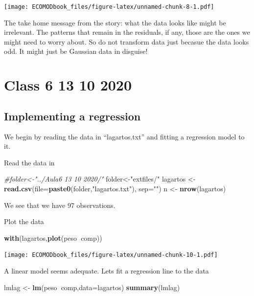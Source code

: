 \documentclass[
]{book}
\newenvironment{Shaded}{\begin{snugshade}}{\end{snugshade}}
\newcommand{\CommentTok}[1]{\textcolor[rgb]{0.56,0.35,0.01}{\textit{#1}}}
\newcommand{\DataTypeTok}[1]{\textcolor[rgb]{0.13,0.29,0.53}{#1}}
\newcommand{\KeywordTok}[1]{\textcolor[rgb]{0.13,0.29,0.53}{\textbf{#1}}}
\newcommand{\NormalTok}[1]{#1}
\newcommand{\OperatorTok}[1]{\textcolor[rgb]{0.81,0.36,0.00}{\textbf{#1}}}
\newcommand{\StringTok}[1]{\textcolor[rgb]{0.31,0.60,0.02}{#1}}
\begin{document}
\texttt{[image: ECOMODbook\_files/figure-latex/unnamed-chunk-8-1.pdf]}

The take home message from the story: what the data looks like might be irrelevant. The patterns that remain in the residuals, if any, those are the ones we might need to worry about. So do not transform data just becasue the data looks odd. It might just be Gaussian data in disguise!

\hypertarget{aula6}{%
\chapter{Class 6 13 10 2020}\label{aula6}}

\hypertarget{implementing-a-regression}{%
\section{Implementing a regression}\label{implementing-a-regression}}

We begin by reading the data in ``lagartos.txt'' and fitting a regression model to it.

Read the data in

\begin{Shaded}
\begin{Highlighting}[]
\CommentTok{#folder<-"../Aula6 13 10 2020/"}
\NormalTok{folder<-}\StringTok{"extfiles/"}
\NormalTok{lagartos <-}\StringTok{ }\KeywordTok{read.csv}\NormalTok{(}\DataTypeTok{file=}\KeywordTok{paste0}\NormalTok{(folder,}\StringTok{"lagartos.txt"}\NormalTok{), }\DataTypeTok{sep=}\StringTok{""}\NormalTok{)}
\NormalTok{n <-}\StringTok{ }\KeywordTok{nrow}\NormalTok{(lagartos)}
\end{Highlighting}
\end{Shaded}

We see that we have 97 observations.

Plot the data

\begin{Shaded}
\begin{Highlighting}[]
\KeywordTok{with}\NormalTok{(lagartos,}\KeywordTok{plot}\NormalTok{(peso}\OperatorTok{~}\NormalTok{comp))}
\end{Highlighting}
\end{Shaded}

\texttt{[image: ECOMODbook\_files/figure-latex/unnamed-chunk-10-1.pdf]}

A linear model seems adequate. Lets fit a regression line to the data

\begin{Shaded}
\begin{Highlighting}[]
\NormalTok{lmlag <-}\StringTok{ }\KeywordTok{lm}\NormalTok{(peso}\OperatorTok{~}\NormalTok{comp,}\DataTypeTok{data=}\NormalTok{lagartos)}
\KeywordTok{summary}\NormalTok{(lmlag)}
\end{Highlighting}
\end{Shaded}
\end{document}
